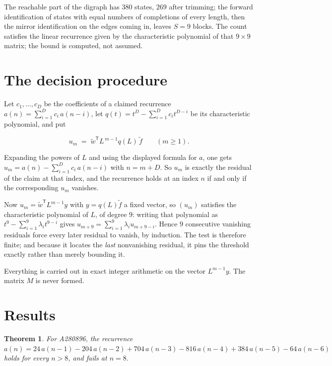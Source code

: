 \documentclass[11pt]{article}
\newtheorem{theorem}{Theorem}
\theoremstyle{definition}
\begin{document}
The reachable part of the digraph has $380$ states, $269$ after trimming; the forward identification of states with equal numbers of completions of every length, then the mirror identification on the edges coming in, leaves $S = 9$ blocks. The count satisfies the linear recurrence given by the characteristic polynomial of that $9\times9$ matrix; the bound is computed, not assumed.

\section{The decision procedure}

Let $c_1,\dots,c_D$ be the coefficients of a claimed recurrence $a(n) = \sum_{i=1}^{D} c_i\,a(n-i)$, let $q(t) = t^{D} - \sum_{i=1}^{D} c_i t^{D-i}$ be its characteristic polynomial, and put

\[u_m \;=\; \tilde w^{\mathsf T} L^{\,m-1} q(L)\,\tilde f \qquad (m \ge 1).\]

Expanding the powers of $L$ and using the displayed formula for $a$, one gets $u_m = a(n) - \sum_{i=1}^{D} c_i\,a(n-i)$ with $n = m + D$. So $u_m$ is exactly the residual of the claim at that index, and the recurrence holds at an index $n$ if and only if the corresponding $u_m$ vanishes.

Now $u_m = \tilde w^{\mathsf T} L^{m-1} y$ with $y = q(L)\tilde f$ a fixed vector, so $(u_m)$ satisfies the characteristic polynomial of $L$, of degree $9$: writing that polynomial as $t^{9} - \sum_{i=1}^{9} \lambda_i t^{9-i}$ gives $u_{m+9} = \sum_{i=1}^{9} \lambda_i u_{m+9-i}$. Hence $9$ consecutive vanishing residuals force every later residual to vanish, by induction. The test is therefore finite; and because it locates the {\itshape last} nonvanishing residual, it pins the threshold exactly rather than merely bounding it.

Everything is carried out in exact integer arithmetic on the vector $L^{m-1}y$. The matrix $M$ is never formed.

\section{Results}

\begin{theorem} For A280896, the recurrence $a(n) = 24\,a(n-1) - 204\,a(n-2) + 704\,a(n-3) - 816\,a(n-4) + 384\,a(n-5) - 64\,a(n-6)$ holds for every $n > 8$, and fails at $n = 8$.\end{theorem}
\end{document}
